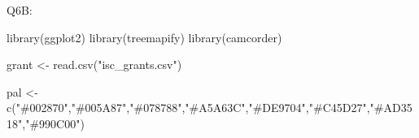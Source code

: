 \documentclass[
  letterpaper,
  DIV=11,
  numbers=noendperiod]{scrartcl}
\newenvironment{Shaded}{}{}
\newcommand{\FunctionTok}[1]{\textcolor[rgb]{0.44,0.26,0.76}{#1}}
\newcommand{\NormalTok}[1]{\textcolor[rgb]{0.14,0.16,0.18}{#1}}
\newcommand{\OtherTok}[1]{\textcolor[rgb]{0.44,0.26,0.76}{#1}}
\newcommand{\StringTok}[1]{\textcolor[rgb]{0.01,0.18,0.38}{#1}}
\begin{document}
Q6B:

\begin{Shaded}
\begin{Highlighting}[]
\FunctionTok{library}\NormalTok{(ggplot2)}
\FunctionTok{library}\NormalTok{(treemapify)}
\FunctionTok{library}\NormalTok{(camcorder)}


\NormalTok{grant }\OtherTok{\textless{}{-}} \FunctionTok{read.csv}\NormalTok{(}\StringTok{"isc\_grants.csv"}\NormalTok{)}

\NormalTok{pal }\OtherTok{\textless{}{-}} \FunctionTok{c}\NormalTok{(}\StringTok{"\#002870"}\NormalTok{,}\StringTok{"\#005A87"}\NormalTok{,}\StringTok{"\#078788"}\NormalTok{,}\StringTok{"\#A5A63C"}\NormalTok{,}\StringTok{"\#DE9704"}\NormalTok{,}\StringTok{"\#C45D27"}\NormalTok{,}\StringTok{"\#AD3518"}\NormalTok{,}\StringTok{"\#990C00"}\NormalTok{)}


\end{Highlighting}
\end{Shaded}
\end{document}
